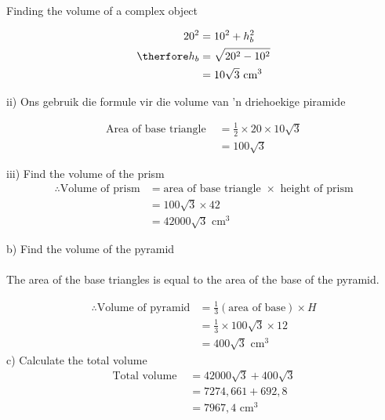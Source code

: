 \begin{wex}{Finding the volume of a complex object}
{\begin{align*}
 20^2 &= 10^2 + h_b^2\\
\therfore h_b&= \sqrt{20^2-10^2}\\
&=10 \sqrt{3}\mbox{ cm}^3
\end{align*}

ii) Ons gebruik die formule vir die volume van ’n driehoekige piramide
% 

\begin{align*}
\mbox{Area of base triangle } &= \frac{1}{2} \times 20 \times 10 \sqrt{3}\\
&=100 \sqrt{3}
\end{align*}

iii) Find the volume of the prism
\begin{align*}
\therefore \mbox{Volume of prism} &= \mbox{area of base triangle }\times \mbox{ height of prism}\\
&=100 \sqrt{3} \times 42\\
&=42000\sqrt{3}\mbox{ cm}^3
\end{align*}

b) Find the volume of the pyramid\\
\\
The area of the base triangles is equal to the area of the base of the pyramid.

\begin{align*}
\therefore \mbox{Volume of pyramid} &= \frac{1}{3} (\mbox{area of base}) \times H\\
&= \frac{1}{3} \times 100 \sqrt{3} \times 12 \\

&=400\sqrt{3}\mbox{ cm}^3
\end{align*}
c) Calculate the total volume
\begin{align*}
\mbox{Total volume } &= 42000\sqrt{3}+400\sqrt{3}\\
&= 7274,661 + 692,8\\
&=7967,4\mbox{ cm}^3
\end{align*}

}
\end{wex}
